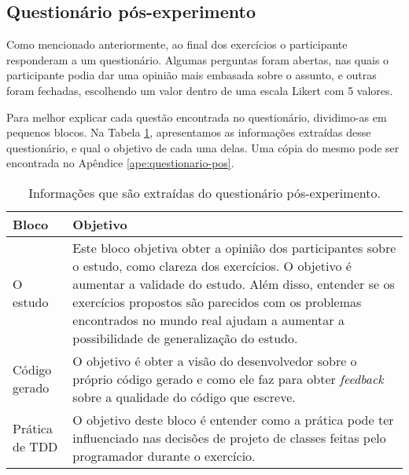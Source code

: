 \subsection{Questionário pós-experimento}
\label{sec:questionario}

Como mencionado anteriormente, ao final dos exercícios o participante responderam a um questionário.
Algumas perguntas foram abertas, nas quais o participante podia dar uma opinião mais embasada sobre o assunto,
e outras foram fechadas, escolhendo um valor dentro de uma escala
Likert com 5 valores.

Para melhor explicar cada questão encontrada no questionário, dividimo-as em pequenos blocos. 
Na Tabela \ref{tab:questionario-pos}, apresentamos
as informações extraídas desse questionário, e qual o objetivo de cada uma delas. Uma cópia
do mesmo pode ser encontrada no Apêndice \ref{ape:questionario-pos}.

\begin{table}
	\centering
	\begin{tabular}{ | p{5cm} | p{5cm} |}
		
		\hline
		
		Bloco & Objetivo \\
		
		\hline
		
		O estudo &
		Este bloco objetiva obter a opinião dos participantes sobre o estudo, como clareza dos
		exercícios. O objetivo é aumentar a validade do estudo.
		Além disso, entender se os exercícios propostos são parecidos com os problemas encontrados no mundo
		real ajudam a aumentar a possibilidade de generalização do estudo.
		\\ \hline
		
		Código gerado &
		O objetivo é obter a visão do desenvolvedor sobre o próprio código gerado e como ele
		faz para obter \textit{feedback} sobre a qualidade do código que escreve.
		\\ \hline
		
		Prática de TDD &
		O objetivo deste bloco é entender como a prática pode ter influenciado
		nas decisões de projeto de classes feitas pelo programador durante o exercício.\\
		
		\hline
		
	\end{tabular}
	\caption{Informações que são extraídas do questionário pós-experimento.}
	\label{tab:questionario-pos}
\end{table}

